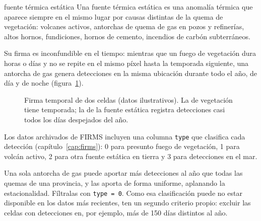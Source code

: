 \begin{definicion}{fuente térmica estática}
Una fuente térmica estática es una anomalía térmica que aparece siempre en el mismo lugar por
causas distintas de la quema de vegetación: volcanes activos, antorchas de quema de gas en
pozos y refinerías, altos hornos, fundiciones, hornos de cemento, incendios de carbón
subterráneos.
\end{definicion}

Su firma es inconfundible en el tiempo: mientras que un fuego de vegetación dura horas o días y
no se repite en el mismo píxel hasta la temporada siguiente, una antorcha de gas genera
detecciones en la misma ubicación durante todo el año, de día y de noche
(figura~\ref{fig:estatica}).

\begin{figure}[ht]
\centering
{}
\caption{Firma temporal de dos celdas (datos ilustrativos). La de vegetación tiene temporada; la
de la fuente estática registra detecciones casi todos los días despejados del año.}
\label{fig:estatica}
\end{figure}

Los datos archivados de FIRMS incluyen una columna \texttt{type} que clasifica cada detección
(capítulo~\ref{cap:firms}): 0 para presunto fuego de vegetación, 1 para volcán activo, 2 para
otra fuente estática en tierra y 3 para detecciones en el mar.

\begin{atencion}
Una sola antorcha de gas puede aportar más detecciones al año que todas las quemas de una
provincia, y las aporta de forma uniforme, aplanando la estacionalidad. Fíltralas con
\texttt{type = 0}. Como esa clasificación puede no estar disponible en los datos más recientes,
ten un segundo criterio propio: excluir las celdas con detecciones en, por ejemplo, más de 150
días distintos al año.
\end{atencion}

